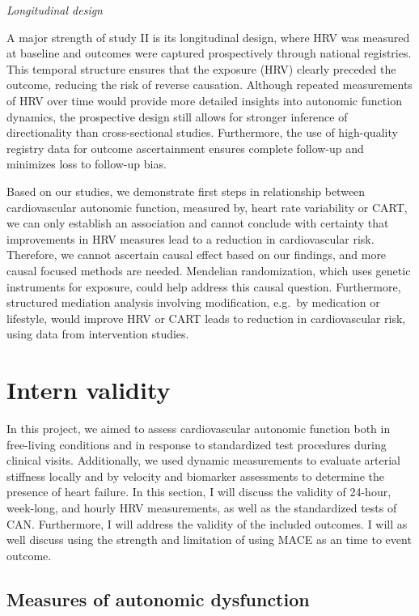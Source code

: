 \documentclass[
  a4paper,
  headsepline=true,
  open=any]{scrbook}
\begin{document}
\emph{Longitudinal design}

A major strength of study II is its longitudinal design, where HRV was
measured at baseline and outcomes were captured prospectively through
national registries. This temporal structure ensures that the exposure
(HRV) clearly preceded the outcome, reducing the risk of reverse
causation. Although repeated measurements of HRV over time would provide
more detailed insights into autonomic function dynamics, the prospective
design still allows for stronger inference of directionality than
cross-sectional studies. Furthermore, the use of high-quality registry
data for outcome ascertainment ensures complete follow-up and minimizes
loss to follow-up bias.

Based on our studies, we demonstrate first steps in relationship between
cardiovascular autonomic function, measured by, heart rate variability
or CART, we can only establish an association and cannot conclude with
certainty that improvements in HRV measures lead to a reduction in
cardiovascular risk. Therefore, we cannot ascertain causal effect based
on our findings, and more causal focused methods are needed. Mendelian
randomization, which uses genetic instruments for exposure, could help
address this causal question. Furthermore, structured mediation analysis
involving modification, e.g.~by medication or lifestyle, would improve
HRV or CART leads to reduction in cardiovascular risk, using data from
intervention studies.

\hypertarget{intern-validity}{%
\section{Intern validity}\label{intern-validity}}

In this project, we aimed to assess cardiovascular autonomic function
both in free-living conditions and in response to standardized test
procedures during clinical visits. Additionally, we used dynamic
measurements to evaluate arterial stiffness locally and by velocity and
biomarker assessments to determine the presence of heart failure. In
this section, I will discuss the validity of 24-hour, week-long, and
hourly HRV measurements, as well as the standardized tests of CAN.
Furthermore, I will address the validity of the included outcomes. I
will as well discuss using the strength and limitation of using MACE as
an time to event outcome.

\hypertarget{measures-of-autonomic-dysfunction}{%
\subsection{Measures of autonomic
dysfunction}\label{measures-of-autonomic-dysfunction}}
\end{document}

